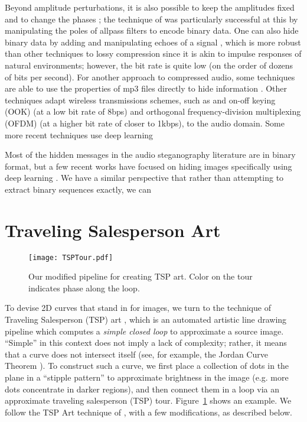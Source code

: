 \documentclass[runningheads]{llncs}
\begin{document}
Beyond amplitude perturbations, it is also possible to keep the amplitudes fixed and to change the phases \cite{xiaoxiao_dong_data_2004, hwan_sik_yun_acoustic_2010}; the technique of \cite{malik_robust_2007} was particularly successful at this by manipulating the poles of allpass filters to encode binary data.  One can also hide binary data by adding and manipulating echoes of a signal \cite{gruhl1996echo}, which is more robust than other techniques to lossy compression since it is akin to impulse responses of natural environments; however, the bit rate is quite low (on the order of dozens of bits per second).  For another approach to compressed audio, some techniques are able to use the properties of mp3 files directly to hide information \cite{qiao_steganalysis_2009,atoum2013exploring}.  Other techniques adapt wireless transmissions schemes, such as and on-off keying (OOK) \cite{madhavapeddy_audio_2005} (at a low bit rate of 8bps) and orthogonal frequency-division multiplexing (OFDM) \cite{eichelberger_receiving_2019} (at a higher bit rate of closer to 1kbps), to the audio domain.  Some more recent techniques use deep learning \cite{kreuk2020hide, wu2020audio}

Most of the hidden messages in the audio steganography literature are in binary format, but a few recent works have focused on hiding images specifically using deep learning \cite{cui_multi-stage_2021, geleta_pixinwav_2021, takahashi_source_2022}.  We have a similar perspective that rather than attempting to extract binary sequences exactly, we can

\section{Traveling Salesperson Art}
\label{sec:tspart}

\begin{figure}
  \centering
  \texttt{[image: TSPTour.pdf]}
  \caption{Our modified pipeline for creating TSP art.  Color on the tour indicates phase along the loop.}
  \label{fig:TSPTour}
\end{figure}

To devise 2D curves that stand in for images, we turn to the technique of  Traveling Salesperson (TSP) art \cite{bosch2004continuous, kaplan2005tsp,bosch2008connecting}, which is an automated artistic line drawing pipeline which computes a {\em simple closed loop} to approximate a source image.  ``Simple'' in this context does not imply a lack of complexity; rather, it means that a curve does not intersect itself (see, for example, the Jordan Curve Theorem \cite{bosch2009jordan}).  To construct such a curve, we first place a collection of dots in the plane in a ``stipple pattern'' to approximate brightness in the image (e.g. more dots concentrate in darker regions), and then connect them in a loop via an approximate traveling salesperson (TSP) tour.  Figure~\ref{fig:TSPTour} shows an example.  We follow the TSP Art technique of \cite{kaplan2005tsp}, with a few modifications, as described below.
\end{document}
